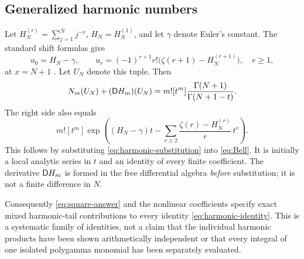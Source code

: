 \subsection{Generalized harmonic numbers}
Let $H_N^{(r)}=\sum_{j=1}^Nj^{-r}$, $H_N=H_N^{(1)}$, and let
$\gamma$ denote Euler's constant. The standard shift formulas give
\begin{equation}\label{eq:harmonic-substitution}
 u_0=H_N-\gamma,\qquad
 u_r=(-1)^{r+1}r!\bigl(\zeta(r+1)-H_N^{(r+1)}\bigr),\quad r\ge1,
\end{equation}
at $x=N+1$ \cite{DLMF5,DLMF25}. Let $U_N$ denote this tuple. Then
\begin{equation}\label{eq:harmonic-identity}
 N_m(U_N)+(\mathsf D H_m)(U_N)
 =m![t^m]\frac{\Gamma(N+1)}{\Gamma(N+1-t)}.
\end{equation}
The right side also equals
\begin{equation}\label{eq:harmonic-generator}
 m![t^m]\exp\left((H_N-\gamma)t-
 \sum_{r\ge2}\frac{\zeta(r)-H_N^{(r)}}r\,t^r\right).
\end{equation}
This follows by substituting \eqref{eq:harmonic-substitution} into
\eqref{eq:Bell}. It is initially a local analytic series in $t$ and an
identity of every finite coefficient. The derivative $\mathsf D H_m$ is formed
in the free differential algebra \emph{before} substitution; it is not a
finite difference in $N$.

Consequently \eqref{eq:square-answer} and the nonlinear coefficients
specify exact mixed harmonic-tail contributions to every identity
\eqref{eq:harmonic-identity}. This is a systematic family of identities,
not a claim that the individual harmonic products have been shown
arithmetically independent or that every integral of one isolated
polygamma monomial has been separately evaluated.
